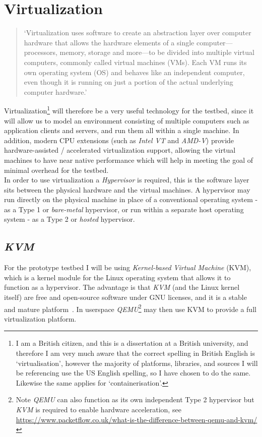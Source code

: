 \documentclass[
    author={Jacob Daniel Halsey},
    supervisor={Prof. Awais Rashid},
    degree={BSc},
    title={Building a Testbed for Evaluating Privacy Enhancing Technologies  (PETs)},
    subtitle={},
    type={software development},
    year={2021}
]{dissertation}
\begin{document}
\section{Virtualization}

\begin{quotation}
	`Virtualization uses software to create an abstraction layer over computer hardware that allows the hardware 
	elements of a single computer—processors, memory, storage and more—to be divided into multiple virtual computers, 
	commonly called virtual machines (VMs). Each VM runs its own operating system (OS) and behaves like an independent 
	computer, even though it is running on just a portion of the actual underlying computer hardware.'~\cite{ibm_virtualization}
\end{quotation}

Virtualization\footnote{I am a British citizen, and this is a dissertation at a British university, 
and therefore I am very much aware that the correct spelling in British English is `virtualisation', however the
majority of platforms, libraries, and sources I will be referencing use the US English spelling, 
so I have chosen to do the same. Likewise the same applies for `containerisation'.}
 will therefore be a very useful technology for the testbed, since it will allow us to model
an environment consisting of multiple computers such as application clients and servers, and run
them all within a single machine. In addition, modern CPU extensions (such as \emph{Intel VT} and \emph{AMD-V}) 
provide hardware-assisted / accelerated virtualization support, allowing the virtual machines to 
have near native performance which will help in meeting the goal of minimal overhead for the testbed. \\

In order to use virtualization a \emph{Hypervisor} is required, this is the software layer sits between
the physical hardware and the virtual machines. A hypervisor may run directly on the physical machine
in place of a conventional operating system - as a Type 1 or \emph{bare-metal} hypervisor,
or run within a separate host operating system - as a Type 2 or \emph{hosted} hypervisor. \\

\subsection{\emph{KVM}}
\label{subsect:kvm}

For the prototype testbed I will be using \emph{Kernel-based Virtual Machine} (KVM), which is a 
kernel module for the Linux operating system that allows it to function as a hypervisor. 
The advantage is that \emph{KVM} (and the Linux kernel itself) are free and open-source software 
under GNU licenses, and it is a stable and mature platform~\cite{redhat_kvm}.
In userspace \emph{QEMU}\footnote{Note \emph{QEMU} can also function as its own independent Type 2 hypervisor 
	but \emph{KVM} is required to enable hardware acceleration,
see \url{https://www.packetflow.co.uk/what-is-the-difference-between-qemu-and-kvm/}}
may then use KVM to provide a full virtualization platform. \\
\end{document}
